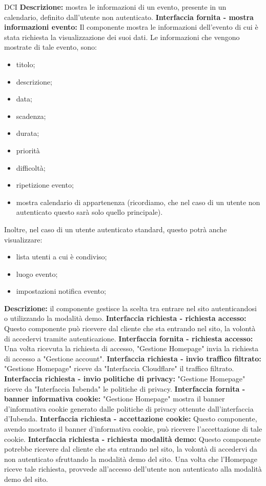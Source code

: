 \begin{listaPersonale}{DCI}
    \textbf{Descrizione:} mostra le informazioni di un evento, presente in un calendario, definito dall'utente non autenticato.
    \textbf{Interfaccia fornita - mostra informazioni evento:} Il componente mostra le informazioni dell'evento di cui è stata richiesta la visualizzazione dei suoi dati. Le informazioni che vengono mostrate di tale evento, sono:
    \begin{itemize}
        \item titolo;
        \item descrizione;
        \item data;
        \item scadenza;
        \item durata;
        \item priorità
        \item difficoltà;
        \item ripetizione evento;
        \item mostra calendario di appartenenza (ricordiamo, che nel caso di un utente non autenticato questo sarà solo quello principale).
    \end{itemize}
    Inoltre, nel caso di un utente autenticato standard, questo potrà anche visualizzare:
    \begin{itemize}
        \item lista utenti a cui è condiviso;
        \item luogo evento;
        \item impostazioni notifica evento;
    \end{itemize}


    \textbf{Descrizione:} il componente gestisce la scelta tra entrare nel sito autenticandosi o utilizzando la modalità demo.
    \textbf{Interfaccia richiesta - richiesta accesso:} Questo componente può ricevere dal cliente che sta entrando nel sito, la volontà di accedervi tramite autenticazione.
    \textbf{Interfaccia fornita - richiesta accesso:} Una volta ricevuta la richiesta di accesso, "Gestione Homepage" invia la richiesta di accesso a "Gestione account".
    \textbf{Interfaccia richiesta - invio traffico filtrato:} "Gestione Homepage" riceve da "Interfaccia Cloudflare" il traffico filtrato.
    \textbf{Interfaccia richiesta - invio politiche di privacy:} "Gestione Homepage" riceve da "Interfaccia Iubenda" le politiche di privacy.
    \textbf{Interfaccia fornita - banner informativa cookie:} "Gestione Homepage" mostra il banner d'informativa cookie generato dalle politiche di privacy ottenute dall'interfaccia d'Iubenda.
    \textbf{Interfaccia richiesta - accettazione cookie:} Questo componente, avendo mostrato il banner d'informativa cookie, può ricevere l'accettazione di tale cookie.
    \textbf{Interfaccia richiesta - richiesta modalità demo:} Questo componente potrebbe ricevere dal cliente che sta entrando nel sito, la volontà di accedervi da non autenticato sfruttando la modalità demo del sito. Una volta che l'Homepage riceve tale richiesta, provvede all'accesso dell'utente non autenticato alla modalità demo del sito.



\end{listaPersonale}
